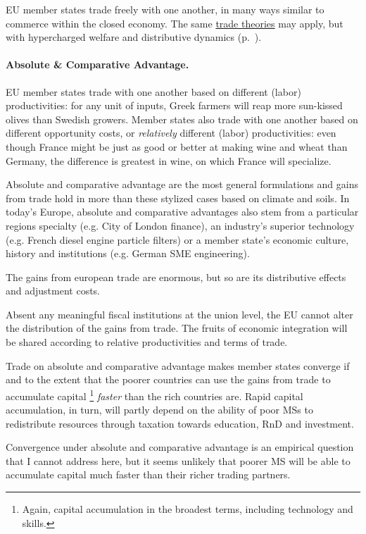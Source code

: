 \documentclass[11pt,a4paper,oneside]{article}
\begin{document}
\gls{EU} member states trade freely with one another, in many ways similar to commerce within the closed economy.
The same \hyperref[sec:space]{trade theories} may apply, but with hypercharged welfare and distributive dynamics (p.~\pageref{sec:space}).

\paragraph{Absolute \& Comparative Advantage.}
\gls{EU} member states trade with one another based on different (labor) productivities:
for any unit of inputs, Greek farmers will reap more sun-kissed olives than Swedish growers.
Member states also trade with one another based on different opportunity costs, or \emph{relatively} different (labor) productivities:
even though France might be just as good or better at making wine and wheat than Germany, the difference is greatest in wine, on which France will specialize.

Absolute and comparative advantage are the most general formulations and gains from trade hold in more than these stylized cases based on climate and soils.
In today's Europe, absolute and comparative advantages also stem from a particular regions specialty (e.g. City of London finance), an industry's superior technology (e.g. French diesel engine particle filters) or a member state's economic culture, history and institutions (e.g. German \gls{SME} engineering).

The gains from european trade are enormous, but so are its distributive effects and adjustment costs.

Absent any meaningful fiscal institutions at the union level, the \gls{EU} cannot alter the distribution of the gains from trade.
The fruits of economic integration will be shared according to relative productivities and terms of trade.

Trade on absolute and comparative advantage makes member states converge if and to the extent that the poorer countries can use the gains from trade to accumulate capital\ignorespaces
 \footnote{
		Again, capital accumulation in the broadest terms, including technology and skills.
	}
\emph{faster} than the rich countries are.
Rapid capital accumulation, in turn, will partly depend on the ability of poor \glspl{MS} to redistribute resources through taxation towards education, \gls{RnD} and investment.

Convergence under absolute and comparative advantage is an empirical question that I cannot address here, but it seems unlikely that poorer \gls{MS} will be able to accumulate capital much faster than their richer trading partners.
\end{document}
